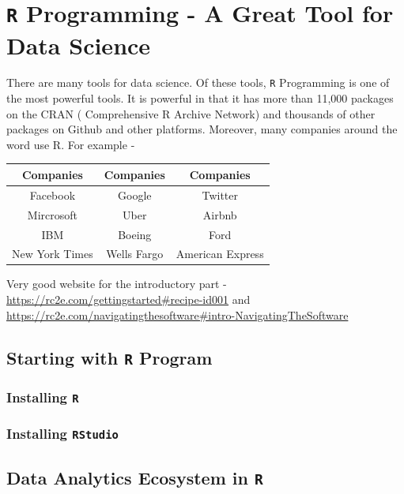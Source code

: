 \documentclass[
]{book}
\begin{document}
\hypertarget{r-programming---a-great-tool-for-data-science}{%
\chapter{\texorpdfstring{\texttt{R} Programming - A Great Tool for Data Science}{R Programming - A Great Tool for Data Science}}\label{r-programming---a-great-tool-for-data-science}}

There are many tools for data science. Of these tools, \texttt{R} Programming is one of the most powerful tools. It is powerful in that it has more than 11,000 packages on the CRAN ( Comprehensive R Archive Network) and thousands of other packages on Github and other platforms. Moreover, many companies around the word use R. For example -

\begin{longtable}[]{@{}ccc@{}}
\toprule
Companies & Companies & Companies\tabularnewline
\midrule
\endhead
Facebook & Google & Twitter\tabularnewline
Mircrosoft & Uber & Airbnb\tabularnewline
IBM & Boeing & Ford\tabularnewline
New York Times & Wells Fargo & American Express\tabularnewline
\bottomrule
\end{longtable}

Very good website for the introductory part - \url{https://rc2e.com/gettingstarted\#recipe-id001} and \url{https://rc2e.com/navigatingthesoftware\#intro-NavigatingTheSoftware}

\hypertarget{starting-with-r-program}{%
\section{\texorpdfstring{Starting with \texttt{R} Program}{Starting with R Program}}\label{starting-with-r-program}}

\hypertarget{installing-r}{%
\subsection{\texorpdfstring{Installing \texttt{R}}{Installing R}}\label{installing-r}}

\hypertarget{installing-rstudio}{%
\subsection{\texorpdfstring{Installing \texttt{RStudio}}{Installing RStudio}}\label{installing-rstudio}}

\hypertarget{data-analytics-ecosystem-in-r}{%
\section{\texorpdfstring{Data Analytics Ecosystem in \texttt{R}}{Data Analytics Ecosystem in R}}\label{data-analytics-ecosystem-in-r}}
\end{document}

